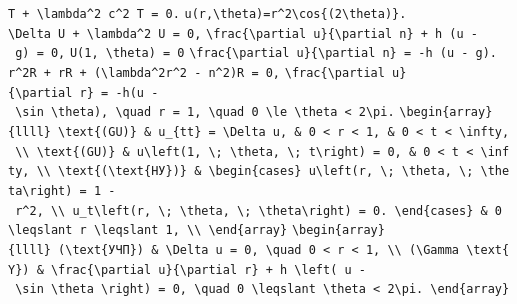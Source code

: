 \documentclass[
  ukrainian,
]{article}
\begin{document}
\texttt{T\textquotesingle{}\textquotesingle{}\ +\ \textbackslash{}lambda\^{}2\ c\^{}2\ T\ =\ 0.}
\texttt{u(r,\textbackslash{}theta)=r\^{}2\textbackslash{}cos\{(2\textbackslash{}theta)\}.}
\texttt{\textbackslash{}Delta\ U\ +\ \textbackslash{}lambda\^{}2\ U\ =\ 0,}
\texttt{\textbackslash{}frac\{\textbackslash{}partial\ u\}\{\textbackslash{}partial\ n\}\ +\ h\ (u\ -\ g)\ =\ 0,}
\texttt{U(1,\ \textbackslash{}theta)\ =\ 0}
\texttt{\textbackslash{}frac\{\textbackslash{}partial\ u\}\{\textbackslash{}partial\ n\}\ =\ -h\ (u\ -\ g).}
\texttt{r\^{}2R\textquotesingle{}\textquotesingle{}\ +\ rR\textquotesingle{}\ +\ (\textbackslash{}lambda\^{}2r\^{}2\ -\ n\^{}2)R\ =\ 0,}
\texttt{\textbackslash{}frac\{\textbackslash{}partial\ u\}\{\textbackslash{}partial\ r\}\ =\ -h(u\ -\ \textbackslash{}sin\ \textbackslash{}theta),\ \textbackslash{}quad\ r\ =\ 1,\ \textbackslash{}quad\ 0\ \textbackslash{}le\ \textbackslash{}theta\ \textless{}\ 2\textbackslash{}pi.}
\texttt{\textbackslash{}begin\{array\}\{llll\}\ \textbackslash{}text\{(GU)\}\ \&\ u\_\{tt\}\ =\ \textbackslash{}Delta\ u,\ \&\ 0\ \textless{}\ r\ \textless{}\ 1,\ \&\ 0\ \textless{}\ t\ \textless{}\ \textbackslash{}infty,\ \textbackslash{}\textbackslash{}\ \textbackslash{}text\{(GU)\}\ \&\ u\textbackslash{}left(1,\ \textbackslash{};\ \textbackslash{}theta,\ \textbackslash{};\ t\textbackslash{}right)\ =\ 0,\ \&\ 0\ \textless{}\ t\ \textless{}\ \textbackslash{}infty,\ \textbackslash{}\textbackslash{}\ \textbackslash{}text\{(\textbackslash{}text\{НУ\})\}\ \&\ \textbackslash{}begin\{cases\}\ u\textbackslash{}left(r,\ \textbackslash{};\ \textbackslash{}theta,\ \textbackslash{};\ \textbackslash{}theta\textbackslash{}right)\ =\ 1\ -\ r\^{}2,\ \textbackslash{}\textbackslash{}\ u\_t\textbackslash{}left(r,\ \textbackslash{};\ \textbackslash{}theta,\ \textbackslash{};\ \textbackslash{}theta\textbackslash{}right)\ =\ 0.\ \textbackslash{}end\{cases\}\ \&\ 0\ \textbackslash{}leqslant\ r\ \textbackslash{}leqslant\ 1,\ \textbackslash{}\textbackslash{}\ \textbackslash{}end\{array\}}
\texttt{\textbackslash{}begin\{array\}\{llll\}\ (\textbackslash{}text\{УЧП\})\ \&\ \textbackslash{}Delta\ u\ =\ 0,\ \textbackslash{}quad\ 0\ \textless{}\ r\ \textless{}\ 1,\ \textbackslash{}\textbackslash{}\ (\textbackslash{}Gamma\ \textbackslash{}text\{Y\})\ \&\ \textbackslash{}frac\{\textbackslash{}partial\ u\}\{\textbackslash{}partial\ r\}\ +\ h\ \textbackslash{}left(\ u\ -\ \textbackslash{}sin\ \textbackslash{}theta\ \textbackslash{}right)\ =\ 0,\ \textbackslash{}quad\ 0\ \textbackslash{}leqslant\ \textbackslash{}theta\ \textless{}\ 2\textbackslash{}pi.\ \textbackslash{}end\{array\}}
\end{document}
